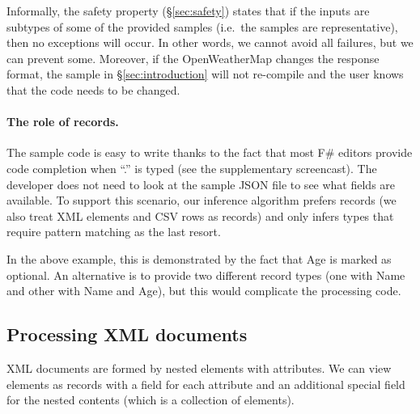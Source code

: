 \documentclass[10pt,preprint,blind,clearpagebib]{sigplanconf}
\newcommand{\ident}[1]{\textnormal{\sffamily #1}}
\begin{document}
Informally, the safety property (\S\ref{sec:safety}) states that if the inputs
are subtypes of some of the provided samples (i.e.~the samples are representative), then
no exceptions will occur. In other words, we cannot avoid all failures, but we can prevent some.
Moreover, if the OpenWeatherMap changes the response format, the sample in \S\ref{sec:introduction}
will not re-compile and the user knows that the code needs to be changed. 

\paragraph{The role of records.}
The sample code is easy to write thanks to the fact that most F\# editors provide code completion
when ``.'' is typed (see the supplementary screencast). The developer does not need to look at the 
sample JSON file to see what fields are available. To support this scenario, our inference algorithm 
prefers records (we also treat XML elements and CSV rows as records) and only infers types that 
require pattern matching as the last resort.

In the above example, this is demonstrated by the fact that \ident{Age} is marked as optional.
An alternative is to provide two different record types (one with \ident{Name} and other with 
\ident{Name} and \ident{Age}), but this would complicate the processing code.


\subsection{Processing XML documents}
\label{sec:providers-xml}

XML documents are formed by nested elements with attributes. We can view elements as records with 
a field for each attribute and an additional special field for the nested contents (which is a 
collection of elements).
\end{document}

